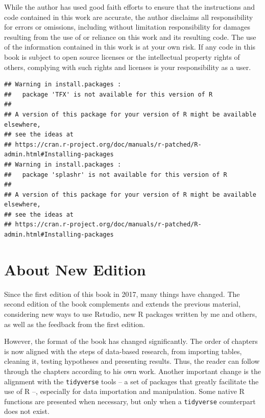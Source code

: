 \documentclass[
  12pt,
]{book}
\begin{document}
\vspace{0.5cm}

\small{While the author has used good faith efforts to ensure that the instructions and code contained in this work are accurate, the author disclaims all responsibility for errors or omissions, including without limitation responsibility for damages resulting from the use of or reliance on this work and its resulting code. The use of the information contained in this work is at your own risk. If any code in this book is subject to open source licenses or the intellectual property rights of others, complying with such rights and licenses is your responsibility as a user.}




{
\setcounter{tocdepth}{2}
\tableofcontents
}
\begin{verbatim}
## Warning in install.packages :
##   package 'TFX' is not available for this version of R
## 
## A version of this package for your version of R might be available elsewhere,
## see the ideas at
## https://cran.r-project.org/doc/manuals/r-patched/R-admin.html#Installing-packages
## Warning in install.packages :
##   package 'splashr' is not available for this version of R
## 
## A version of this package for your version of R might be available elsewhere,
## see the ideas at
## https://cran.r-project.org/doc/manuals/r-patched/R-admin.html#Installing-packages
\end{verbatim}

\hypertarget{about-new-edition}{%
\chapter*{About New Edition}\label{about-new-edition}}

Since the first edition of this book in 2017, many things have changed. The second edition of the book complements and extends the previous material, considering new ways to use Rstudio, new R packages written by me and others, as well as the feedback from the first edition.

However, the format of the book has changed significantly. The order of chapters is now aligned with the steps of data-based research, from importing tables, cleaning it, testing hypotheses and presenting results. Thus, the reader can follow through the chapters according to his own work. Another important change is the alignment with the \texttt{tidyverse} tools -- a set of packages that greatly facilitate the use of R --, especially for data importation and manipulation. Some native R functions are presented when necessary, but only when a \texttt{tidyverse} counterpart does not exist.
\end{document}

